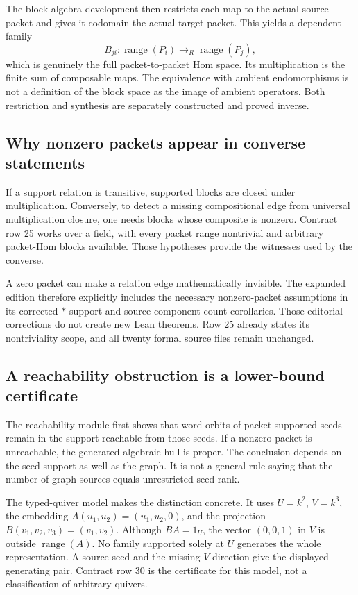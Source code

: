 \documentclass[11pt,a4paper]{article}
\begin{document}
The block-algebra development then restricts each map to the actual source packet and gives it codomain the actual target packet. This yields a dependent family
\[
B_{ji}:\operatorname{range}(P_i)\longrightarrow_R\operatorname{range}(P_j),
\]
which is genuinely the full packet-to-packet Hom space. Its multiplication is the finite sum of composable maps. The equivalence with ambient endomorphisms is not a definition of the block space as the image of ambient operators. Both restriction and synthesis are separately constructed and proved inverse.

\subsection{Why nonzero packets appear in converse statements}

If a support relation is transitive, supported blocks are closed under multiplication. Conversely, to detect a missing compositional edge from universal multiplication closure, one needs blocks whose composite is nonzero. Contract row 25 works over a field, with every packet range nontrivial and arbitrary packet-Hom blocks available. Those hypotheses provide the witnesses used by the converse.

A zero packet can make a relation edge mathematically invisible. The expanded edition therefore explicitly includes the necessary nonzero-packet assumptions in its corrected $*$-support and source-component-count corollaries. Those editorial corrections do not create new Lean theorems. Row 25 already states its nontriviality scope, and all twenty formal source files remain unchanged.

\subsection{A reachability obstruction is a lower-bound certificate}

The reachability module first shows that word orbits of packet-supported seeds remain in the support reachable from those seeds. If a nonzero packet is unreachable, the generated algebraic hull is proper. The conclusion depends on the seed support as well as the graph. It is not a general rule saying that the number of graph sources equals unrestricted seed rank.

The typed-quiver model makes the distinction concrete. It uses $U=k^2$, $V=k^3$, the embedding
$A(u_1,u_2)=(u_1,u_2,0)$, and the projection $B(v_1,v_2,v_3)=(v_1,v_2)$. Although $BA=1_U$, the vector $(0,0,1)$ in $V$ is outside $\operatorname{range}(A)$. No family supported solely at $U$ generates the whole representation. A source seed and the missing $V$-direction give the displayed generating pair. Contract row 30 is the certificate for this model, not a classification of arbitrary quivers.
\end{document}
